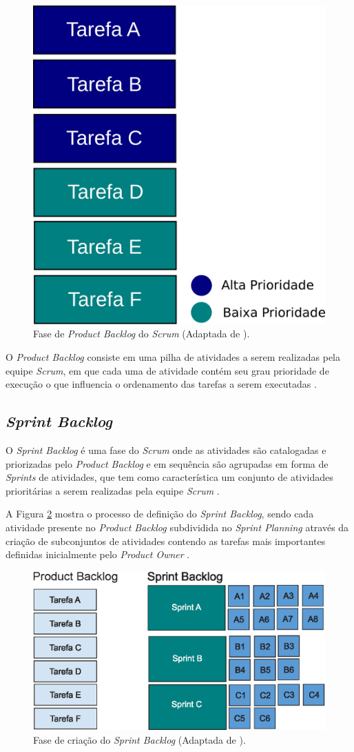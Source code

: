 \begin{figure}[!h]
  \centering
  \includegraphics[width=.40\textwidth]{figuras/product_backlog3.eps} 
  \caption{Fase de \textit{Product Backlog} do \textit{Scrum} (Adaptada de \cite{rubin2012essential}).}
  \label{product-backlog} 
\end{figure}

O \textit{Product Backlog} consiste em uma pilha de atividades a serem realizadas pela equipe \textit{Scrum}, em que cada uma de atividade contém seu grau prioridade de execução o que influencia o ordenamento das tarefas a serem executadas \cite{rubin2012essential}.

\subsection*{\textit{Sprint Backlog}}

\noindent O \textit{Sprint Backlog} é uma fase do \textit{Scrum} onde as atividades são catalogadas e priorizadas pelo \textit{Product Backlog} e em sequência são agrupadas em forma de \textit{Sprints} de atividades, que tem como característica um conjunto de atividades prioritárias a serem realizadas pela equipe \textit{Scrum} \cite{pressmanengenharia, rubin2012essential}.

A Figura \ref{sprint-backlog} mostra o processo de definição do \textit{Sprint Backlog}, sendo cada atividade presente no \textit{Product Backlog} subdividida no \textit{Sprint Planning} através da criação de subconjuntos de atividades contendo as tarefas mais importantes definidas inicialmente pelo \textit{Product Owner} \cite{rubin2012essential}.

\begin{figure}[!h]
  \centering
  \includegraphics[width=.70\textwidth]{figuras/sprint-backlog.eps} 
  \caption{Fase de criação do \textit{Sprint Backlog} (Adaptada de \cite{rubin2012essential}).}
  \label{sprint-backlog} 
\end{figure}

